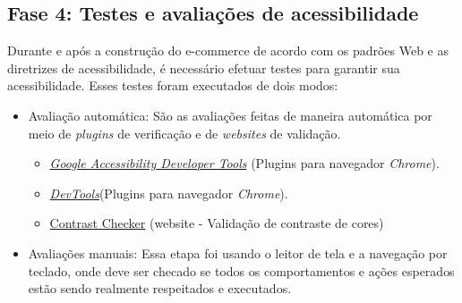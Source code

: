 \subsection{Fase 4: Testes e avaliações de acessibilidade}
{Durante e após a construção do e-commerce de acordo com os
padrões Web e as diretrizes de acessibilidade, é necessário efetuar testes para garantir sua acessibilidade. Esses testes foram executados de dois modos: 
\begin{itemize}
\item Avaliação automática: São as avaliações feitas de maneira automática por meio de \textit{plugins} de verificação e de \textit{websites} de validação.
\begin{itemize}
\item \href{https://chrome.google.com/webstore/detail/accessibility-developer-t/fpkknkljclfencbdbgkenhalefipecmb?hl=pt-BR}{\textit{Google Accessibility Developer Tools}} ({Plugins} para navegador \textit{Chrome}).
\item \href{https://developer.chrome.com/docs/devtools/}{\textit{DevTools}}({Plugins} para navegador \textit{Chrome}).
\item \href{https://contrastchecker.com/}{Contrast Checker} (website - Validação de contraste de cores)
\end{itemize}
\item Avaliações manuais: Essa etapa foi usando o leitor de tela e a navegação por teclado, onde deve ser checado se todos os comportamentos e ações esperados estão sendo realmente respeitados e executados.
\end{itemize}
}


